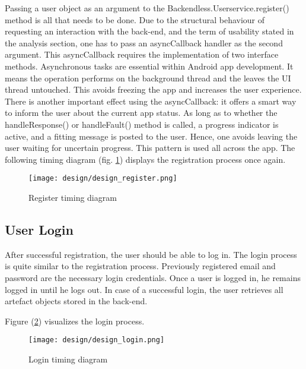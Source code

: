 Passing a user object as an argument to the Backendless.Userservice.register() method is all that needs to be done. Due to the structural behaviour of requesting an interaction with the back-end, and the term of usability stated in the analysis section, one has to pass an asyncCallback handler as the second argument. This asyncCallback requires the implementation of two interface methods. Asynchronous tasks are essential within Android app development. It means the operation performs on the background thread and the leaves the UI thread untouched. This avoids freezing the app and increases the user experience. There is another important effect using the asyncCallback: it offers a smart way to inform the user about the current app status. As long as to whether the handleResponse() or handleFault() method is called, a progress indicator is active, and a fitting message is posted to the user. Hence, one avoids leaving the user waiting for uncertain progress. This pattern is used all across the app.
The following timing diagram (fig. \ref{fig:designRegister}) displays the registration process once again.

\begin{figure}[H]
	\centering \texttt{[image: design/design\_register.png]}
	\caption{Register timing diagram}
	\label{fig:designRegister}
\end{figure}

\subsection{User Login}
After successful registration, the user should be able to log in. The login process is quite similar to the registration process. Previously registered email and password are the necessary login credentials.
Once a user is logged in, he remains logged in until he logs out. In case of a successful login, the user retrieves all artefact objects stored in the back-end. 

\begin{mdframed}

\end{mdframed}



Figure (\ref{fig:designLogin}) visualizes the login process. 

\begin{figure}[H]
	\centering \texttt{[image: design/design\_login.png]}
	\caption{Login timing diagram}
	\label{fig:designLogin}
\end{figure}

